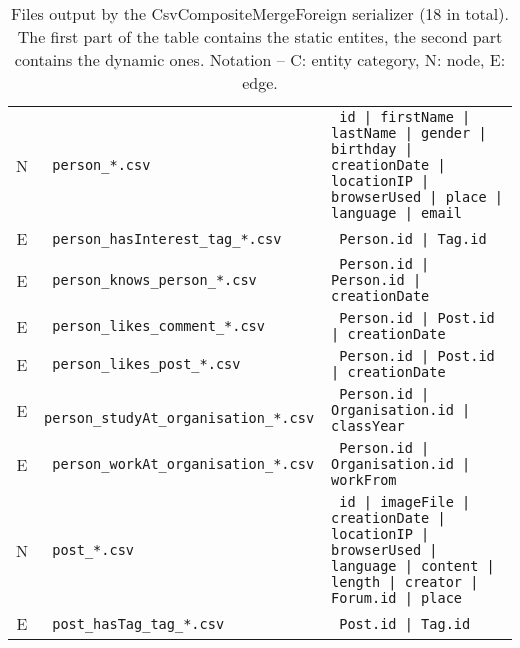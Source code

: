 \begin{table}[htb]
\begin{tabularx}{\linewidth}{|>{\sffamily}c|>{\tt}l|>{\tt}X|}
        \hline
        N                    & person\_*.csv                        & id | firstName | lastName | gender | birthday | creationDate | locationIP | browserUsed | place | language | email  \\
        E                    & person\_hasInterest\_tag\_*.csv      & Person.id | Tag.id                                                                                                  \\
        E                    & person\_knows\_person\_*.csv         & Person.id | Person.id | creationDate                                                                                \\
        E                    & person\_likes\_comment\_*.csv        & Person.id | Post.id | creationDate                                                                                  \\
        E                    & person\_likes\_post\_*.csv           & Person.id | Post.id | creationDate                                                                                  \\
        E                    & person\_studyAt\_organisation\_*.csv & Person.id | Organisation.id | classYear                                                                             \\
        E                    & person\_workAt\_organisation\_*.csv  & Person.id | Organisation.id | workFrom                                                                              \\
        \hline
        N                    & post\_*.csv                          & id | imageFile | creationDate | locationIP | browserUsed | language | content | length | creator | Forum.id | place \\
        E                    & post\_hasTag\_tag\_*.csv             & Post.id | Tag.id                                                                                                    \\
        \hline
    \end{tabularx}
    \caption{Files output by the CsvCompositeMergeForeign serializer (18 in total). The first part of the table contains the static entites, the second part contains the dynamic ones.
        Notation -- \textsf{C}: entity category, \textsf{N}: node, \textsf{E}: edge.}
    \label{table:csv_composite_merge_foreign}
\end{table}
